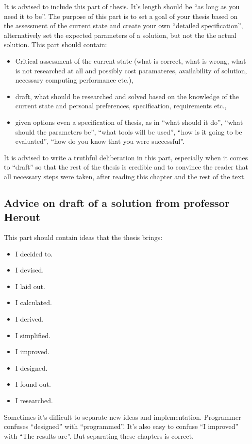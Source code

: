 It is advised to include this part of thesis. It's length should be ``as long as you need it to be''. The purpose of this part is to set a goal of your thesis based on the assessment of the current state and create your own ``detailed specification'', alternatively set the expected parameters of a solution, but not the the actual solution. This part should contain:
\begin{itemize}
  \item{Critical assessment of the current state (what is correct, what is wrong, what is not researched at all and possibly cost paramateres, availability of solution, necessary computing performance etc.),}
  \item{draft, what should be researched and solved based on the knowledge of the current state and personal preferences, specification, requirements etc.,}
  \item{given options even a specification of thesis, as in ``what should it do'', ``what should the parameters be'', ``what tools will be used'', ``how is it going to be evaluated'', ``how do you know that you were successful''.}
\end{itemize}
It is advised to write a truthful deliberation in this part, especially when it comes to ``draft'' so that the rest of the thesis is credible and to convince the reader that all necessary steps were taken, after reading this chapter and the rest of the text.


\subsection{Advice on draft of a solution from professor Herout}

This part should contain ideas that the thesis brings:
\begin{itemize}
  \item{I decided to.}
  \item{I devised.}
  \item{I laid out.}
  \item{I calculated.}
  \item{I derived.}
  \item{I simplified.}
  \item{I improved.}
  \item{I designed.}
  \item{I found out.}
  \item{I researched.}
\end{itemize}

Sometimes it's difficult to separate new ideas and implementation. Programmer confuses ``designed'' with ``programmed''.
It's also easy to confuse ``I improved'' with ``The results are''. But separating these chapters is correct.


